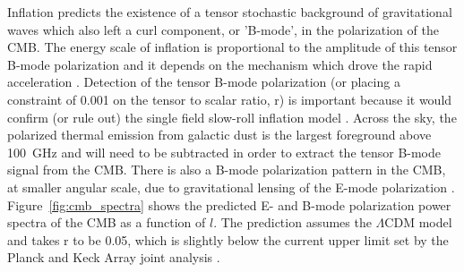 Inflation predicts the existence of a tensor stochastic background of gravitational waves which also left a curl component, or 'B-mode', in the polarization of the \ac{CMB}.  
The energy scale of inflation is proportional to the amplitude of this tensor B-mode polarization and it depends on the mechanism which drove the rapid acceleration \cite{Grishchuk1975} \cite{starobinsky1982} \cite{Rubakov1982} \cite{starobinskii1983} \cite{Abbott1984}.
Detection of the tensor B-mode polarization (or placing a constraint of 0.001 on the tensor to scalar ratio, r) is important because it would confirm (or rule out) the single field slow-roll inflation model \cite{Abazajian2015}.
Across the sky, the polarized thermal emission from galactic dust is the largest foreground above 100~GHz \cite{PlanckXXX} and will need to be subtracted in order to extract the tensor B-mode signal from the \ac{CMB}. 
There is also a B-mode polarization pattern in the \ac{CMB}, at smaller angular scale, due to gravitational lensing of the E-mode polarization \cite{polarbear2014} \cite{naess2014} \cite{keisler2015}.
Figure~\ref{fig:cmb_spectra} shows the predicted E- and B-mode polarization power spectra of the \ac{CMB} as a function of $\textit{l}$. 
The prediction assumes the $\Lambda$CDM model and takes r to be 0.05, which is slightly below the current upper limit set by the Planck and Keck Array joint analysis \cite{keckplanck}. 


%



